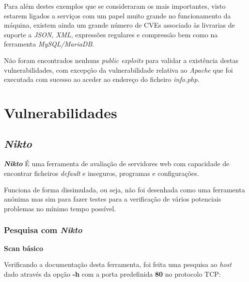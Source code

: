 \documentclass[10pt,english]{article}
\begin{document}
\par Para além destes exemplos que se consideraram os mais importantes, visto estarem ligados a serviços com um papel muito grande no funcionamento da máquina, existem ainda um grande número de CVEs associado às livrarias de suporte a \textit{JSON}, \textit{XML}, expressões regulares e compressão bem como na ferramenta \textit{MySQL/MariaDB}.

\par Não foram encontrados nenhuns \textit{public exploits} para validar a existência destas vulnerabilidades, com excepção da vulnerabilidade relativa ao \textit{Apache} que foi executada com sucesso ao aceder ao endereço do ficheiro \textit{info.php}. 

 \clearpage

\section{Vulnerabilidades}

\subsection{\textit{Nikto}}
\par \textbf{\textit{Nikto}} É uma ferramenta de avaliação de servidores web com capacidade de encontrar ficheiros \textit{default} e inseguros, programas e configurações.

\par Funciona de forma dissimulada, ou seja, não foi desenhada como uma ferramenta anónima mas sim para fazer testes para a verificação de vários potenciais problemas no mínimo tempo possível.

\subsubsection{Pesquisa com \textit{Nikto}}

    \textbf{Scan básico}

    \par Verificando a documentação  desta  ferramenta, foi feita uma pesquisa ao \textit{host} dado através da opção \textbf{-h} com a porta predefinida \textbf{80} no protocolo TCP:
\end{document}
